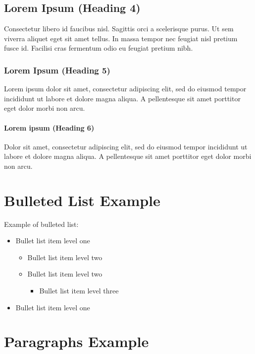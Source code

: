 \documentclass{nyu22report}
\begin{document}
\subsection{Lorem Ipsum (Heading 4)}

Consectetur libero id faucibus nisl. Sagittis orci a scelerisque purus. Ut sem
viverra aliquet eget sit amet tellus. In massa tempor nec feugiat nisl pretium
fusce id. Facilisi cras fermentum odio eu feugiat pretium nibh.

\subsubsection{Lorem Ipsum (Heading 5)}

Lorem ipsum dolor sit amet, consectetur adipiscing elit, sed do eiusmod tempor
incididunt ut labore et dolore magna aliqua. A pellentesque sit amet porttitor
eget dolor morbi non arcu.

\paragraph{Lorem ipsum (Heading 6)}

Dolor sit amet, consectetur adipiscing elit, sed do eiusmod tempor incididunt ut
labore et dolore magna aliqua. A pellentesque sit amet porttitor eget dolor
morbi non arcu.

\section{Bulleted List Example}

Example of bulleted list:

\begin{itemize}
    \item Bullet list item level one
    \begin{itemize}
        \item Bullet list item level two
        \item Bullet list item level two
        \begin{itemize}
            \item Bullet list item level three
        \end{itemize}
    \end{itemize}
    \item Bullet list item level one
\end{itemize}


\section{Paragraphs Example}
\end{document}
